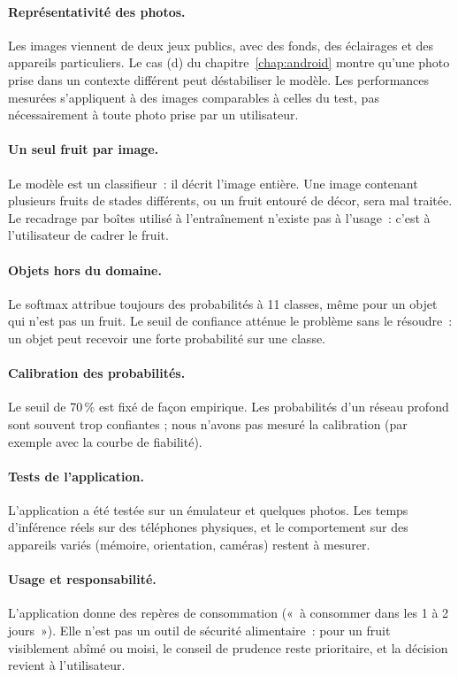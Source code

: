 \paragraph{Représentativité des photos.} Les images viennent de deux jeux publics, avec des fonds, des éclairages et des appareils particuliers. Le cas (d) du chapitre~\ref{chap:android} montre qu’une photo prise dans un contexte différent peut déstabiliser le modèle. Les performances mesurées s’appliquent à des images comparables à celles du test, pas nécessairement à toute photo prise par un utilisateur.

\paragraph{Un seul fruit par image.} Le modèle est un classifieur~: il décrit l’image entière. Une image contenant plusieurs fruits de stades différents, ou un fruit entouré de décor, sera mal traitée. Le recadrage par boîtes utilisé à l’entraînement n’existe pas à l’usage~: c’est à l’utilisateur de cadrer le fruit.

\paragraph{Objets hors du domaine.} Le softmax attribue toujours des probabilités à 11 classes, même pour un objet qui n’est pas un fruit. Le seuil de confiance atténue le problème sans le résoudre~: un objet peut recevoir une forte probabilité sur une classe.

\paragraph{Calibration des probabilités.} Le seuil de 70\,\% est fixé de façon empirique. Les probabilités d’un réseau profond sont souvent trop confiantes ; nous n’avons pas mesuré la calibration (par exemple avec la courbe de fiabilité).

\paragraph{Tests de l’application.} L’application a été testée sur un émulateur et quelques photos. Les temps d’inférence réels sur des téléphones physiques, et le comportement sur des appareils variés (mémoire, orientation, caméras) restent à mesurer.

\paragraph{Usage et responsabilité.} L’application donne des repères de consommation («~à consommer dans les 1 à 2 jours~»). Elle n’est pas un outil de sécurité alimentaire~: pour un fruit visiblement abîmé ou moisi, le conseil de prudence reste prioritaire, et la décision revient à l’utilisateur.

